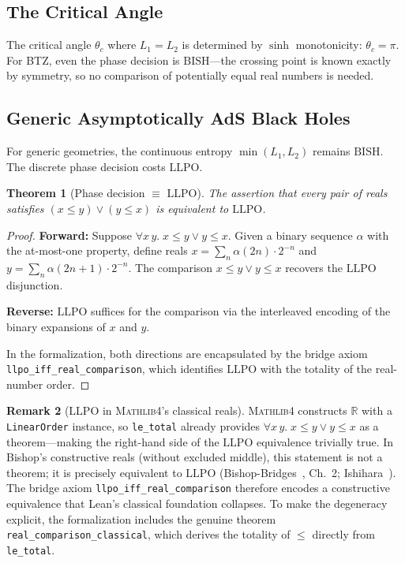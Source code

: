 \documentclass[11pt,a4paper]{article}
\theoremstyle{plain}
\newtheorem{theorem}{Theorem}[section]
\theoremstyle{definition}
\newtheorem{remark}[theorem]{Remark}
\newcommand{\RR}{\mathbb{R}}
\newcommand{\LLPO}{\ensuremath{\mathrm{LLPO}}}
\newcommand{\BISH}{\ensuremath{\mathrm{BISH}}}
\newcommand{\Mathlib}{\textsc{Mathlib4}}
\begin{document}
\subsection{The Critical Angle}

The critical angle $\theta_c$ where $L_1 = L_2$ is determined
by $\sinh$ monotonicity: $\theta_c = \pi$.
For BTZ, even the phase decision is $\BISH$---the crossing
point is known exactly by symmetry, so no comparison of
potentially equal real numbers is needed.

\subsection{Generic Asymptotically AdS Black Holes}\label{sec:generic}

For generic geometries, the continuous entropy $\min(L_1, L_2)$
remains $\BISH$.  The discrete phase decision costs $\LLPO$.

\begin{theorem}[Phase decision $\equiv$ $\LLPO$]\label{thm:phase-llpo}
The assertion that every pair of reals satisfies
$(x \leq y) \lor (y \leq x)$ is equivalent to $\LLPO$.
\end{theorem}

\begin{proof}
\textbf{Forward:} Suppose $\forall x\,y.\; x \leq y \lor y \leq x$.
Given a binary sequence $\alpha$ with the at-most-one property,
define reals
$x = \sum_{n} \alpha(2n) \cdot 2^{-n}$ and
$y = \sum_{n} \alpha(2n+1) \cdot 2^{-n}$.
The comparison $x \leq y \lor y \leq x$ recovers the $\LLPO$
disjunction.

\medskip\noindent
\textbf{Reverse:} $\LLPO$ suffices for the comparison via
the interleaved encoding of the binary expansions of $x$ and $y$.

\medskip\noindent
In the formalization, both directions are encapsulated by the
bridge axiom \texttt{llpo\_iff\_real\_comparison}, which identifies
$\LLPO$ with the totality of the real-number order.
\end{proof}

\begin{remark}[$\LLPO$ in \Mathlib's classical reals]\label{rem:llpo-degen}
\Mathlib{} constructs $\RR$ with a \texttt{LinearOrder} instance,
so \texttt{le\_total} already provides
$\forall x\,y.\; x \le y \lor y \le x$ as a theorem---making the
right-hand side of the $\LLPO$ equivalence trivially true.
In Bishop's constructive reals (without excluded middle), this
statement is not a theorem; it is precisely equivalent to $\LLPO$
(Bishop-Bridges~\cite{BB1985}, Ch.~2; Ishihara~\cite{Ishihara2006}).
The bridge axiom \texttt{llpo\_iff\_real\_comparison} therefore
encodes a constructive equivalence that Lean's classical
foundation collapses.  To make the degeneracy explicit, the
formalization includes the genuine theorem
\texttt{real\_comparison\_classical}, which derives the totality
of $\le$ directly from \texttt{le\_total}.
\end{remark}
\end{document}
